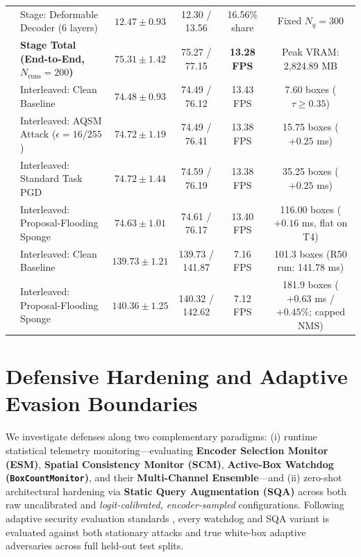 \documentclass[preprint,10pt]{elsarticle}
\begin{document}
\begin{table}[!htbp]
{\begin{tabular}{llcccc}
& Stage: Deformable Decoder (6 layers) & $12.47 \pm 0.93$ & 12.30 / 13.56 & 16.56\% share & Fixed $N_q = 300$ \\
& \textbf{Stage Total (End-to-End, $N_{\mathrm{runs}}=200$)} & $\mathbf{75.31 \pm 1.42}$ & 75.27 / 77.15 & \textbf{13.28 FPS} & Peak VRAM: 2,824.89 MB \\
& Interleaved: Clean Baseline & $74.48 \pm 0.93$ & 74.49 / 76.12 & 13.43 FPS & 7.60 boxes ($\tau \ge 0.35$) \\
& Interleaved: AQSM Attack ($\epsilon = 16/255$) & $74.72 \pm 1.19$ & 74.49 / 76.41 & 13.38 FPS & 15.75 boxes ($+0.25$ ms) \\
& Interleaved: Standard Task PGD & $74.72 \pm 1.44$ & 74.59 / 76.19 & 13.38 FPS & 35.25 boxes ($+0.25$ ms) \\
& Interleaved: Proposal-Flooding Sponge & $74.63 \pm 1.01$ & 74.61 / 76.17 & 13.40 FPS & 116.00 boxes ($+0.16$ ms, flat on T4) \\
\midrule
{} & Interleaved: Clean Baseline & $139.73 \pm 1.21$ & 139.73 / 141.87 & 7.16 FPS & 101.3 boxes (R50 run: 141.78 ms) \\
& Interleaved: Proposal-Flooding Sponge & $140.36 \pm 1.25$ & 140.32 / 142.62 & 7.12 FPS & 181.9 boxes ($+0.63$ ms / $+0.45\%$; capped NMS) \\
\bottomrule
\end{tabular}%
}
\end{table}

\section{Defensive Hardening and Adaptive Evasion Boundaries}
\label{sec:defense_evaluation}

We investigate defenses along two complementary paradigms: (i) runtime statistical telemetry monitoring---evaluating \textbf{Encoder Selection Monitor (ESM)}, \textbf{Spatial Consistency Monitor (SCM)}, \textbf{Active-Box Watchdog (\texttt{BoxCountMonitor})}, and their \textbf{Multi-Channel Ensemble}---and (ii) zero-shot architectural hardening via \textbf{Static Query Augmentation (SQA)} across both raw uncalibrated and \textit{logit-calibrated, encoder-sampled} configurations. Following adaptive security evaluation standards \citep{carlini2019evaluating, tramer2020adaptive}, every watchdog and SQA variant is evaluated against both stationary attacks and true white-box adaptive adversaries across full held-out test splits.
\end{document}
